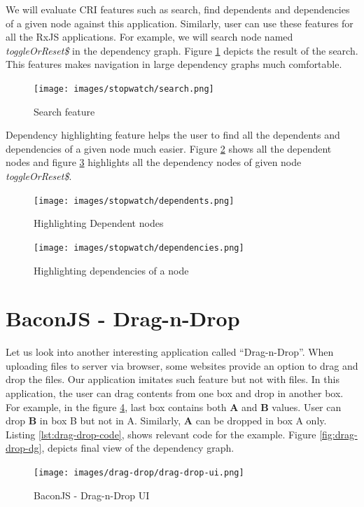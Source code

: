 We will evaluate CRI features such as search, find dependents and dependencies of a given node against this application. Similarly, user can use these features for all the RxJS applications. 
For example, we will search node named \textit{toggleOrReset\$} in the dependency graph. Figure \ref{fig:stopwatch-search} depicts the result of the search. This features makes navigation in large dependency graphs much comfortable.

\begin{figure}[!h]
	\centering
	\texttt{[image: images/stopwatch/search.png]}
	\caption{Search feature}
	\label{fig:stopwatch-search}
\end{figure}

Dependency highlighting feature helps the user to find all the dependents and dependencies of a given node much easier. Figure \ref{fig:dependents} shows all the dependent nodes and figure \ref{fig:dependencies} highlights all the dependency nodes of given node \textit{toggleOrReset\$}.  

\begin{figure}[!h]
	\centering
	\texttt{[image: images/stopwatch/dependents.png]}
	\caption{Highlighting Dependent nodes}
	\label{fig:dependents}
\end{figure}

\begin{figure}[!h]
	\centering
	\texttt{[image: images/stopwatch/dependencies.png]}
	\caption{Highlighting dependencies of a node}
	\label{fig:dependencies}
\end{figure}

\section{BaconJS - Drag-n-Drop}
Let us look into another interesting application called ``Drag-n-Drop''. When uploading files to server via browser, some websites provide an option to drag and drop the files. Our application imitates such feature but not with files. In this application, the user can drag contents from one box and drop in another box. For example, in the figure \ref{fig:drag-drop-ui}, last box contains both \textbf{A} and \textbf{B} values. User can drop \textbf{B} in box B but not in A. Similarly, \textbf{A} can be dropped in box A only. Listing \ref{lst:drag-drop-code}, shows relevant code for the example. Figure \ref{fig:drag-drop-dg}, depicts final view of the dependency graph.

\begin{figure}[!h]
	\centering
	\texttt{[image: images/drag-drop/drag-drop-ui.png]}
	\caption{BaconJS - Drag-n-Drop UI}
	\label{fig:drag-drop-ui}
\end{figure}

